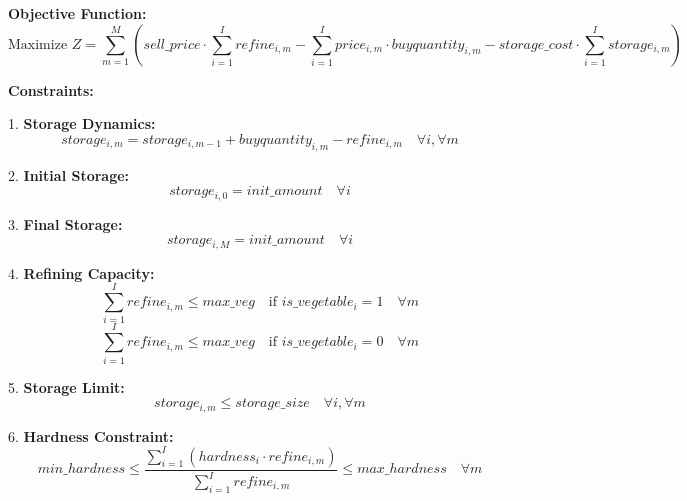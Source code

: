 \documentclass{article}
\begin{document}
\textbf{Objective Function:}
\[
\text{Maximize } Z = \sum_{m=1}^{M} \left( sell\_price \cdot \sum_{i=1}^{I} refine_{i,m} - \sum_{i=1}^{I} price_{i,m} \cdot buyquantity_{i,m} - storage\_cost \cdot \sum_{i=1}^{I} storage_{i,m} \right)
\]

\textbf{Constraints:}

1. \textbf{Storage Dynamics:}
\[
storage_{i,m} = storage_{i,m-1} + buyquantity_{i,m} - refine_{i,m} \quad \forall i, \forall m
\]

2. \textbf{Initial Storage:}
\[
storage_{i,0} = init\_amount \quad \forall i
\]

3. \textbf{Final Storage:}
\[
storage_{i,M} = init\_amount \quad \forall i
\]

4. \textbf{Refining Capacity:}
\[
\sum_{i=1}^{I} refine_{i,m} \leq max\_veg \quad \text{if } is\_vegetable_{i} = 1 \quad \forall m
\]
\[
\sum_{i=1}^{I} refine_{i,m} \leq max\_veg \quad \text{if } is\_vegetable_{i} = 0 \quad \forall m
\]

5. \textbf{Storage Limit:}
\[
storage_{i,m} \leq storage\_size \quad \forall i, \forall m
\]

6. \textbf{Hardness Constraint:}
\[
min\_hardness \leq \frac{\sum_{i=1}^{I} (hardness_{i} \cdot refine_{i,m})}{\sum_{i=1}^{I} refine_{i,m}} \leq max\_hardness \quad \forall m
\]
\end{document}
